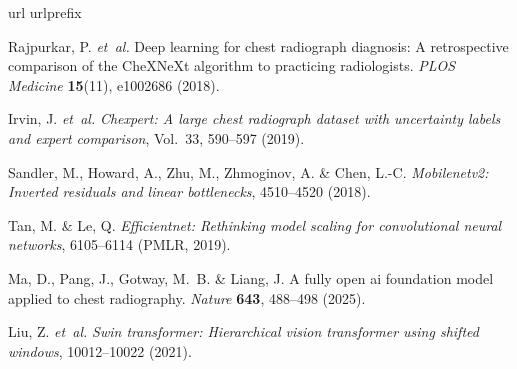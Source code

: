 \documentclass[pdflatex,sn-nature]{sn-jnl}
\begin{document}
\begin{thebibliography}{10}
\expandafter\ifx\csname url\endcsname\relax
  \def\url#1{\burl{#1}}\fi
\expandafter\ifx\csname urlprefix\endcsname\relax\def\urlprefix{URL }\fi
\providecommand{\bibinfo}[2]{#2}
\providecommand{\eprint}[2][]{\url{#2}}
\providecommand{\doi}[1]{\url{https://doi.org/#1}}
\bibcommenthead

\bibinfo{author}{Rajpurkar, P.} \emph{et~al.}
\newblock \bibinfo{title}{Deep learning for chest radiograph diagnosis: A retrospective comparison of the CheXNeXt algorithm to practicing radiologists}.
\newblock \emph{\bibinfo{journal}{PLOS Medicine}}
  \textbf{\bibinfo{volume}{15}}(\bibinfo{number}{11}), \bibinfo{pages}{e1002686}
  (\bibinfo{year}{2018}).

\bibinfo{author}{Irvin, J.} \emph{et~al.}
\newblock \emph{\bibinfo{title}{Chexpert: A large chest radiograph dataset with
  uncertainty labels and expert comparison}}, Vol.~\bibinfo{volume}{33},
  \bibinfo{pages}{590--597} (\bibinfo{year}{2019}).

\bibinfo{author}{Sandler, M.}, \bibinfo{author}{Howard, A.},
  \bibinfo{author}{Zhu, M.}, \bibinfo{author}{Zhmoginov, A.} \&
  \bibinfo{author}{Chen, L.-C.}
\newblock \emph{\bibinfo{title}{Mobilenetv2: Inverted residuals and linear
  bottlenecks}}, \bibinfo{pages}{4510--4520} (\bibinfo{year}{2018}).

\bibinfo{author}{Tan, M.} \& \bibinfo{author}{Le, Q.}
\newblock \emph{\bibinfo{title}{Efficientnet: Rethinking model scaling for
  convolutional neural networks}}, \bibinfo{pages}{6105--6114}
  (\bibinfo{organization}{PMLR}, \bibinfo{year}{2019}).

\bibinfo{author}{Ma, D.}, \bibinfo{author}{Pang, J.}, \bibinfo{author}{Gotway,
  M.~B.} \& \bibinfo{author}{Liang, J.}
\newblock \bibinfo{title}{A fully open ai foundation model applied to chest
  radiography}.
\newblock \emph{\bibinfo{journal}{Nature}} \textbf{\bibinfo{volume}{643}},
  \bibinfo{pages}{488--498} (\bibinfo{year}{2025}).

\bibinfo{author}{Liu, Z.} \emph{et~al.}
\newblock \emph{\bibinfo{title}{Swin transformer: Hierarchical vision
  transformer using shifted windows}}, \bibinfo{pages}{10012--10022}
  (\bibinfo{year}{2021}).


\end{thebibliography}
\end{document}
